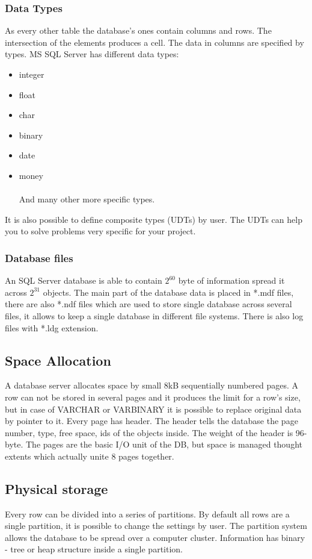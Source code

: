 \documentclass[english]{article}
\begin{document}
\subsubsection{Data Types}
As every other table the database's ones contain columns and rows. The intersection of the elements produces a cell. The data in columns are specified by types. MS SQL Server has different data types:
\begin{itemize}
\item integer
\item float
\item char
\item binary
\item date
\item money
\\\\
And many other more specific types. 
\end{itemize} 
It is also possible to define composite types (UDTs) by user. The UDTs can help you to solve problems very specific for your project.
\subsubsection{Database files}
An SQL Server database is able to contain $2^{60}$ byte of information spread it across $2^{31}$ objects. The main part of the database data is placed in *.mdf files, there are also *.ndf files which are used to store single database across several files, it allows to keep a single database in different file systems. There is also log files with *.ldg extension.

\subsection{Space Allocation}
A database server allocates space by small 8kB sequentially numbered pages. A row can not be stored in several pages and it produces the limit for a row's size, but in case of VARCHAR or VARBINARY it is possible to replace original data by pointer to it. Every page has header. The header tells the database the page number, type, free space, ids of the objects inside. The weight of the header is 96-byte. The pages are the basic I/O unit of the DB, but space is managed thought extents which actually unite 8 pages together.

\subsection{Physical storage}
Every row can be divided into a series of partitions. By default all rows are a single partition, it is possible to change the settings by user. The partition system allows the database to be spread over a computer cluster. Information has binary - tree or heap structure inside a single partition.
\end{document}
